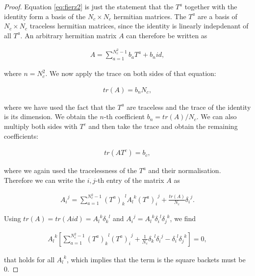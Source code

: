 \documentclass{article}
\theoremstyle{definition}
\numberwithin{equation}{section}
\begin{document}
\begin{proof}

Equation \eqref{eq:fierz2} is just the statement that the $T^a$ together with the identity form a basis of the $N_c \times N_c$ hermitian matrices. The $T^a$ are a basis of $N_c \times N_c$ traceless hermitian matrices, since the identity is linearly indepdenant of all $T^a$. An arbitrary hermitian matrix $A$ can therefore be written as

\begin{align*}
    A = \sum_{a=1}^{N_c^2 -1} b_a T^a + b_n id,
\end{align*}

where $n=N_c^2$. We now apply the trace on both sides of that equation:

\begin{align*}
    tr \left( A \right) = b_n N_c,
\end{align*}

where we have used the fact that the $T^a$ are traceless and the trace of the identity is its dimension. We obtain the $n$-th coefficient $b_n = tr \left( A \right) /N_c$. We can also multiply both sides with $T^c$ and then take the trace and obtain the remaining coefficients:

\begin{align*}
    tr \left( A T^c \right) = b_c,
\end{align*}

where we again used the tracelessness of the $T^a$ and their normalisation. Therefore we can write the $i,j$-th entry of the matrix $A$ as

\begin{align*}
    {A_{i}}^{j} = \sum_{a=1}^{N_c^2 -1} {(T^a)_{k}}^{l} {A_{l}}^{k} {(T^a)_{i}}^{j} + \frac{tr \left( A \right)}{N_c} {\delta_{i}}^{j}.
\end{align*}

Using $tr \left( A \right) = tr \left( A id \right) = {A_{l}}^{k} {\delta_{k}}^{l}$ and ${A_{i}}^{j} = {A_{l}}^{k} {\delta_i}^l {\delta_j}^k$, we find

\begin{align*}
    {A_{l}}^{k} \left[ \sum_{a=1}^{N_c^2 -1} {(T^a)_k}^l {(T^a)_i}^j + \frac{1}{N_c} {\delta_k}^l {\delta_i}^j - {\delta_i}^l {\delta_j}^k \right] = 0,
\end{align*}

that holds for all ${A_{l}}^{k}$, which implies that the term is the square backets must be $0$.

\end{proof}
\end{document}
